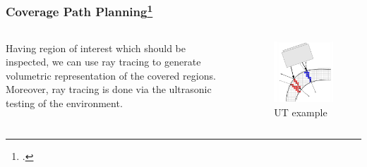 \documentclass[
    11pt, %
    aspectratio=169, %
]{beamer}
\begin{document}
\begin{frame}
    \frametitle{Coverage Path Planning\footcite{felsnerRoboticCoveragePath2021}}

    \begin{columns}[c]
        \begin{column}{0.5\textwidth}
            Having region of interest which should be inspected, we can use ray tracing to 
            generate volumetric representation of the covered regions. 
            \newline\newline
            Moreover, ray tracing is done via the ultrasonic testing of the environment.
        \end{column}
        \begin{column}{0.5\textwidth}
            \begin{figure}
                \includegraphics[scale=0.4]{assets/cpp-example.png}
                \caption{UT example}
            \end{figure}
        \end{column}
    \end{columns}

    

\end{frame}
\end{document}
